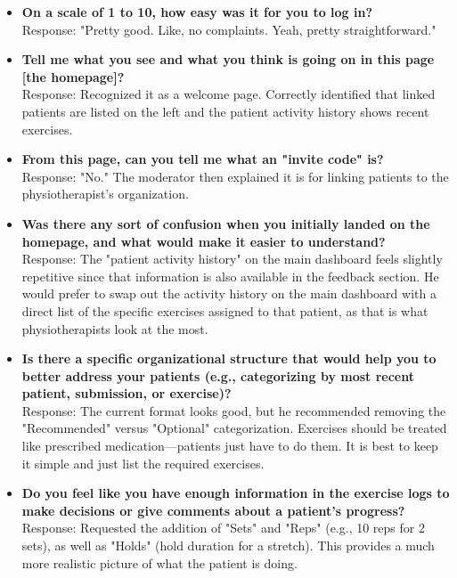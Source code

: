 \documentclass[12pt, titlepage]{article}
\begin{document}
\begin{itemize}
    \item \textbf{On a scale of 1 to 10, how easy was it for you to log in?} \\
    Response: "Pretty good. Like, no complaints. Yeah, pretty straightforward."

    \item \textbf{Tell me what you see and what you think is going on in this page [the homepage]?} \\
    Response: Recognized it as a welcome page. Correctly identified that linked patients are listed on the left and the patient activity history shows recent exercises.

    \item \textbf{From this page, can you tell me what an "invite code" is?} \\
    Response: "No." The moderator then explained it is for linking patients to the physiotherapist's organization.

    \item \textbf{Was there any sort of confusion when you initially landed on the homepage, and what would make it easier to understand?} \\
    Response: The "patient activity history" on the main dashboard feels slightly repetitive since that information is also available in the feedback section. He would prefer to swap out the activity history on the main dashboard with a direct list of the specific exercises assigned to that patient, as that is what physiotherapists look at the most.

    \item \textbf{Is there a specific organizational structure that would help you to better address your patients (e.g., categorizing by most recent patient, submission, or exercise)?} \\
    Response: The current format looks good, but he recommended removing the "Recommended" versus "Optional" categorization. Exercises should be treated like prescribed medication—patients just have to do them. It is best to keep it simple and just list the required exercises.

    \item \textbf{Do you feel like you have enough information in the exercise logs to make decisions or give comments about a patient's progress?} \\
    Response: Requested the addition of "Sets" and "Reps" (e.g., 10 reps for 2 sets), as well as "Holds" (hold duration for a stretch). This provides a much more realistic picture of what the patient is doing.


\end{itemize}
\end{document}
